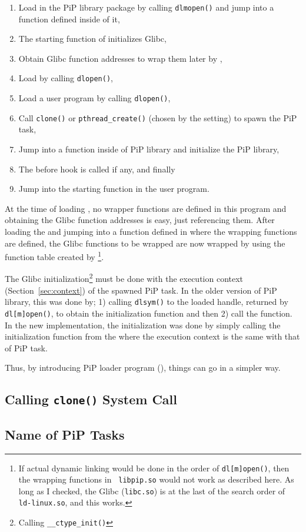 \begin{enumerate}
\item Load  in the PiP library package by calling
  {\tt dlmopen()} and jump into a function defined inside of it,
\item The starting function of  initializes Glibc,
\item Obtain Glibc function addresses to wrap them later by
  ,
\item Load  by calling {\tt dlopen()},
\item Load a user program by calling {\tt dlopen()},
\item Call {\tt clone()} or {\tt pthread_create()} (chosen by the
   setting) to spawn the PiP task,
\item Jump into a function inside of PiP library and initialize the
  PiP library, 
\item The before hook is called if any, and finally
\item Jump into the starting function in the user program.
\end{enumerate}

At the time of loading , no wrapper functions are
defined in this program and obtaining the Glibc function addresses is
easy, just referencing them. After loading the  and
jumping into a function defined in  where the
wrapping functions are defined, the Glibc functions to be wrapped are
now wrapped by using the function table created by
\footnote{If actual dynamic linking would be done in
the order of {\tt dl[m]open()}, then the wrapping functions in {\tt 
  libpip.so} would not work as described here. As long as I checked,
the Glibc ({\tt libc.so}) is at the last of the search order of {\tt
  ld-linux.so}, and this works.}.

The Glibc initialization\footnote{Calling {\tt __ctype_init()}} must
be done with the execution context (Section~\ref{sec:context}) of the
  spawned PiP task. In the older version of PiP library, this was done
  by; 1) calling {\tt dlsym()} to the loaded handle, returned by {\tt
    dl[m]open()}, to obtain the initialization function
and then 2) call the function. In the new implementation, the
initialization was done by simply calling the initialization function
from the  where the execution context is the same
with that of PiP task. 

Thus, by introducing PiP loader program (), things
can go in a simpler way. 


\subsection{Calling {\tt clone()} System Call}\label{sec:clone}

\subsection{Name of PiP Tasks}\label{sec:proc-name}




